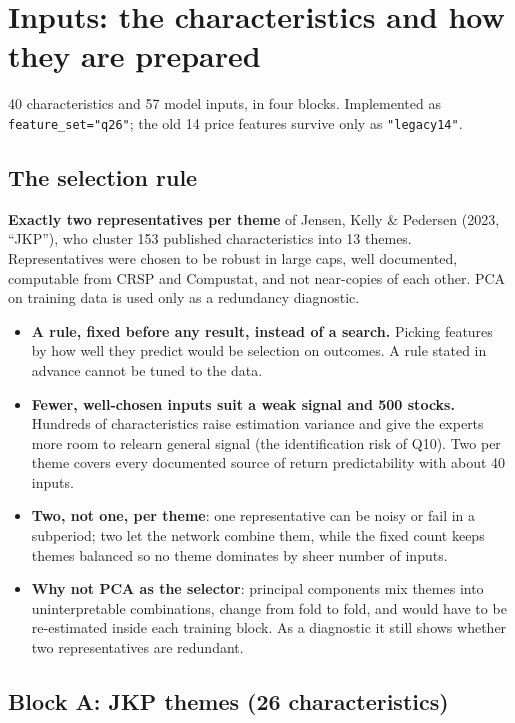 \section{Inputs: the characteristics and how they are prepared}
\label{sec:features}

 40 characteristics and 57 model inputs, in four blocks. Implemented as
\texttt{feature\_set="q26"}; the old 14 price features survive only as \texttt{"legacy14"}.

\subsection{The selection rule}

\textbf{Exactly two representatives per theme} of Jensen, Kelly \& Pedersen (2023, ``JKP''), who cluster 153
published characteristics into 13 themes. Representatives were chosen to be robust in large caps, well
documented, computable from CRSP and Compustat, and not near-copies of each other. PCA on training data is
used only as a redundancy diagnostic.

\begin{whybox}
\begin{itemize}
\item \textbf{A rule, fixed before any result, instead of a search.} Picking features by how well they
  predict would be selection on outcomes. A rule stated in advance cannot be tuned to the data.
\item \textbf{Fewer, well-chosen inputs suit a weak signal and 500 stocks.} Hundreds of characteristics raise
  estimation variance and give the experts more room to relearn general signal (the identification risk of
  Q10). Two per theme covers every documented source of return predictability with about 40 inputs.
\item \textbf{Two, not one, per theme}: one representative can be noisy or fail in a subperiod; two let the
  network combine them, while the fixed count keeps themes balanced so no theme dominates by sheer number
  of inputs.
\item \textbf{Why not PCA as the selector}: principal components mix themes into uninterpretable
  combinations, change from fold to fold, and would have to be re-estimated inside each training block. As a
  diagnostic it still shows whether two representatives are redundant.
\end{itemize}
\end{whybox}

\subsection{Block A: JKP themes (26 characteristics)}

